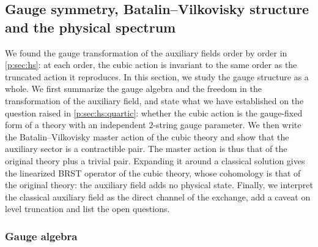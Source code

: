 \subsection{Gauge symmetry, Batalin--Vilkovisky structure and the physical spectrum}
\label{p:sec:gauge}

We found the gauge transformation of the auxiliary fields order by order in \cref{p:sec:hs}: at each order, the cubic action is invariant to the same order as the truncated action it reproduces.
In this section, we study the gauge structure as a whole.
We first summarize the gauge algebra and the freedom in the transformation of the auxiliary field, and state what we have established on the question raised in \cref{p:sec:hs:quartic}: whether the cubic action is the gauge-fixed form of a theory with an independent $2$-string gauge parameter.
We then write the Batalin--Vilkovisky master action of the cubic theory and show that the auxiliary sector is a contractible pair.
The master action is thus that of the original theory plus a trivial pair.
Expanding it around a classical solution gives the linearized BRST operator of the cubic theory, whose cohomology is that of the original theory: the auxiliary field adds no physical state.
Finally, we interpret the classical auxiliary field as the direct channel of the exchange, add a caveat on level truncation and list the open questions.




\subsubsection{Gauge algebra}
\label{p:sec:gauge:algebra}

